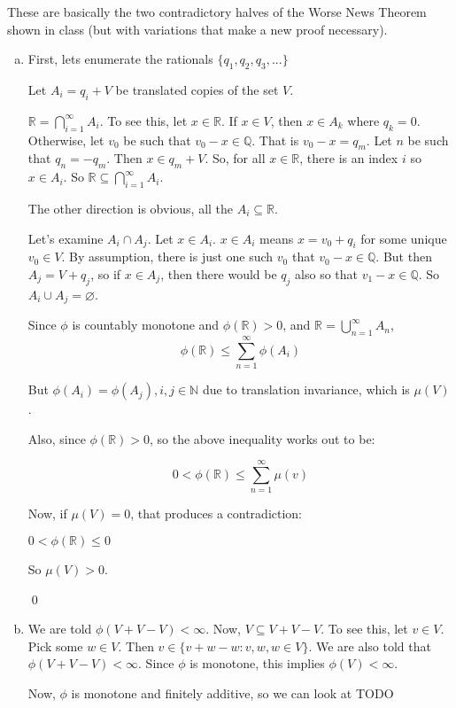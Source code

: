 \documentclass[11pt,oneside]{article}
\numberwithin{equation}{section}
\theoremstyle{definition}
\newtheorem{exercise}{Exercise}
\def\RR{\mathbb{R}}
\def\QQ{\mathbb{Q}}
\def\NN{\mathbb{N}}
\begin{document}
\begin{solution}
  These are basically the two contradictory halves of the Worse News
  Theorem shown in class (but with variations that make a new proof
  necessary).  
  \begin{enumerate}[(a)]
  \item

    First, lets enumerate the rationals $\{ q_1, q_2, q_3, ... \}$ 
    
    Let $A_i = q_i + V$ be translated copies of the set $V$.

    $ \RR = \bigcap \limits _ {i=1} ^ \infty A_i$.  To see this, let $x \in \RR$.  If $x \in V$, then
    $ x \in A_k$ where $q_k = 0$.  Otherwise, let $v_0$ be such that $v_0 - x \in \QQ$.
    That is $v_0 - x = q_m$.  Let $n$ be such that $q_n = -q_m$.  Then $x \in q_m + V$.  So, for all
    $x \in \RR$, there is an index $i$ so $x \in A_i$.  So $\RR \subseteq \bigcap \limits _ {i=1} ^ \infty A_i$.

    The other direction is obvious, all the $A_i \subseteq \RR$.  

    Let's examine $A_i \cap A_j$.  Let $x \in A_i$.  $x \in A_i$ means
    $x = v_0 + q_i$ for some unique $v_0 \in V$. By assumption, there
    is just one such $v_0$ that $v_0 - x \in \QQ$.  But then $A_j = V + q_j$, so if $x \in A_j$, then
    there would be $q_j$ also so that $v_1 - x \in \QQ$.  So $A_i \cup A_j = \varnothing$.

    Since $\phi$ is countably monotone and $\phi (\RR) > 0$, and $\RR = \bigcup \limits _ {n = 1} ^ \infty A_n$,
    $$
    \phi ( \RR ) \leq \sum \limits _ {n=1} ^ \infty \phi (A_i)
    $$

    But $\phi(A_i) = \phi(A_j), i, j \in \NN$ due to translation invariance, which is $\mu(V)$.

    Also, since $\phi(\RR) > 0$, so the above inequality works out to be:

    $$
    0 < \phi(\RR) \leq \sum \limits _ {n=1} ^ \infty \mu(v)
    $$

    Now, if $\mu(V) = 0$, that produces a contradiction:

    $ 0 < \phi( \RR) \leq 0$

    So $\mu(V) > 0$.

    \qed
    
  \item
    We are told $\phi(V + V - V) < \infty$.  Now, $V \subseteq V + V -
    V$.  To see this, let $v \in V$.  Pick some $w \in V$.  Then $v
    \in \{ v + w - w : v, w, w \in V \}$.  We are also told that
    $\phi(V + V - V) < \infty$.  Since $\phi$ is monotone, this
    implies $\phi(V) < \infty$.

    Now, $\phi$ is monotone and finitely additive, so we can look at
    TODO

\end{enumerate}
\end{solution}


\begin{comment}
\begin{exercise}
  problem
\end{exercise}
\begin{solution}
\begin{enumerate}[(a)]
\item
  first answer
\end{enumerate}
\end{solution}
\end{comment}
\end{document}
